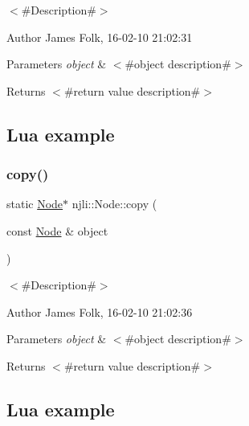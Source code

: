 $<$\#\+Description\#$>$ 

\begin{DoxyAuthor}{Author}
James Folk, 16-\/02-\/10 21\+:02\+:31
\end{DoxyAuthor}

\begin{DoxyParams}{Parameters}
{\em object} & $<$\#object description\#$>$\\
\hline
\end{DoxyParams}
\begin{DoxyReturn}{Returns}
$<$\#return value description\#$>$
\end{DoxyReturn}
\hypertarget{classnjli_1_1_steering_behavior_wander_ex1}{}\subsection{Lua example}\label{classnjli_1_1_steering_behavior_wander_ex1}

\begin{DoxyCodeInclude}
\end{DoxyCodeInclude}
\mbox{\label{classnjli_1_1_node_ab05be8c908fdd34563021ac6e13e7bcb}} 
\subsubsection{\texorpdfstring{copy()}{copy()}}
{\footnotesize\ttfamily static \mbox{\hyperlink{classnjli_1_1_node}{Node}}$\ast$ njli\+::\+Node\+::copy (\begin{DoxyParamCaption}\item[{const \mbox{\hyperlink{classnjli_1_1_node}{Node}} \&}]{object }\end{DoxyParamCaption})\hspace{0.3cm}{\ttfamily [static]}}



$<$\#\+Description\#$>$ 

\begin{DoxyAuthor}{Author}
James Folk, 16-\/02-\/10 21\+:02\+:36
\end{DoxyAuthor}

\begin{DoxyParams}{Parameters}
{\em object} & $<$\#object description\#$>$\\
\hline
\end{DoxyParams}
\begin{DoxyReturn}{Returns}
$<$\#return value description\#$>$
\end{DoxyReturn}
\hypertarget{classnjli_1_1_steering_behavior_wander_ex1}{}\subsection{Lua example}\label{classnjli_1_1_steering_behavior_wander_ex1}

